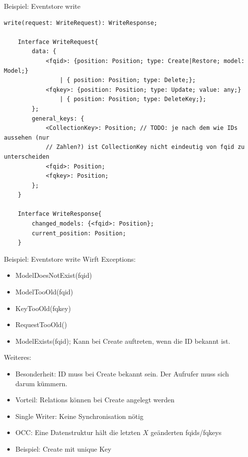 \documentclass[10pt]{beamer}
\begin{document}
\begin{frame}[fragile]{Beispiel: Eventstore write}
	\footnotesize
	\begin{Verbatim}[tabsize=2]
	write(request: WriteRequest): WriteResponse;
	
	Interface WriteRequest{
		data: {
			<fqid>: {position: Position; type: Create|Restore; model: Model;}
				| { position: Position; type: Delete;};
			<fqkey>: {position: Position; type: Update; value: any;}
				| { position: Position; type: DeleteKey;};
		};
		general_keys: {
			<CollectionKey>: Position; // TODO: je nach dem wie IDs aussehen (nur
			// Zahlen?) ist CollectionKey nicht eindeutig von fqid zu unterscheiden
			<fqid>: Position;
			<fqkey>: Position;
		};
	}
	
	Interface WriteResponse{
		changed_models: {<fqid>: Position};
		current_position: Position;
	}
	\end{Verbatim}
\end{frame}
\begin{frame}{Beispiel: Eventstore write}
	Wirft Exceptions:
	\begin{itemize}
		\item ModelDoesNotExist(fqid)
		\item ModelTooOld(fqid)
		\item KeyTooOld(fqkey)
		\item RequestTooOld()
		\item ModelExists(fqid); Kann bei Create auftreten, wenn die ID bekannt ist.
	\end{itemize}
	\pause
	Weiteres:
	\begin{itemize}
		\item Besonderheit: ID muss bei Create bekannt sein. Der Aufrufer muss sich darum kümmern.
		\item Vorteil: Relations können bei Create angelegt werden
		\item<3-> Single Writer: Keine Synchronisation nötig
		\item<4-> OCC: Eine Datenstruktur hält die letzten $X$ geänderten fqids/fqkeys
		\item<5-> Beispiel: Create mit unique Key
	\end{itemize}
\end{frame}

\end{document}
